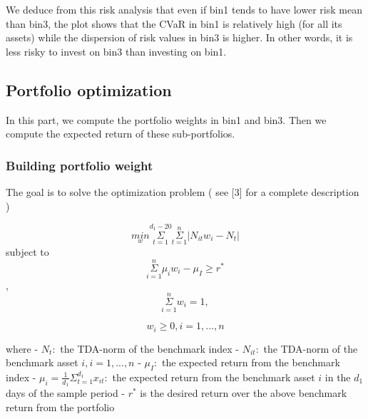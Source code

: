 \documentclass[11pt]{article}
\begin{document}
    We deduce from this risk analysis that even if bin1 tends to have lower
risk mean than bin3, the plot shows that the CVaR in bin1 is relatively
high (for all its assets) while the dispersion of risk values in bin3 is
higher. In other words, it is less risky to invest on bin3 than
investing on bin1.

    \hypertarget{portfolio-optimization}{%
\subsection{Portfolio optimization}\label{portfolio-optimization}}

In this part, we compute the portfolio weights in bin1 and bin3. Then we
compute the expected return of these sub-portfolios.

\hypertarget{building-portfolio-weight}{%
\subsubsection{Building portfolio
weight}\label{building-portfolio-weight}}

The goal is to solve the optimization problem ( see {[}3{]} for a
complete description )

\[ \underset{w}{min} \underset{t=1}{\overset{d_1 -20}{\Sigma}}  \underset{t=1}{\overset{n}{\Sigma}} |N_{it}w_i-N_t|\]
subject to
\[\underset{i=1}{\overset{n}{\Sigma}}\mu_i w_i -\mu_I \geq r^*\],
\[ \underset{i=1}{\overset{n}{\Sigma}}w_i =1,\]

\[w_i \geq 0, i=1,..., n\]

where - \(N_t:\) the TDA-norm of the benchmark index - \(N_{it}:\) the
TDA-norm of the benchmark asset \(i, i=1,..., n\) - \(\mu_I:\) the
expected return from the benchmark index -
\(\mu_i= \frac{1}{d_1} \Sigma_{t=1}^{d_1} x_{it}:\) the expected return
from the benchmark asset \(i\) in the \(d_1\) days of the sample period
- \(r^{*}\) is the desired return over the above benchmark return from
the portfolio
\end{document}
